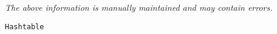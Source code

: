 \label{pkg:hashtable}

{\tiny \it The above information is manually maintained and may contain errors.}
\begin{verbatim}
Hashtable
\end{verbatim}
